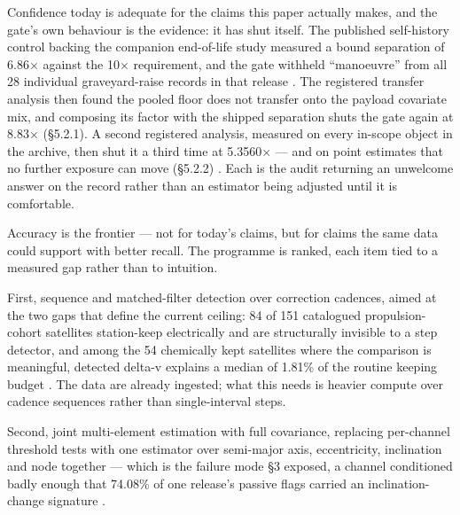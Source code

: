 \documentclass[11pt]{article}
\begin{document}
Confidence today is adequate for the claims this paper actually makes, and the gate's own behaviour is the evidence: it has shut itself. The published self-history control backing the companion end-of-life study measured a bound separation of 6.86$\times$ against the 10$\times$ requirement, and the gate withheld ``manoeuvre'' from all 28 individual graveyard-raise records in that release%
. The registered transfer analysis then found the pooled floor does not transfer onto the payload covariate mix, and composing its factor with the shipped separation shuts the gate again at 8.83$\times$ (\S{}5.2.1). A second registered analysis, measured on every in-scope object in the archive, then shut it a third time at 5.3560$\times$ --- and on point estimates that no further exposure can move (\S{}5.2.2)%
. Each is the audit returning an unwelcome answer on the record rather than an estimator being adjusted until it is comfortable.

Accuracy is the frontier --- not for today's claims, but for claims the same data could support with better recall. The programme is ranked, each item tied to a measured gap rather than to intuition.

First, sequence and matched-filter detection over correction cadences, aimed at the two gaps that define the current ceiling: 84 of 151 catalogued propulsion-cohort satellites station-keep electrically and are structurally invisible to a step detector, and among the 54 chemically kept satellites where the comparison is meaningful, detected delta-v explains a median of 1.81\% of the routine keeping budget%
. The data are already ingested; what this needs is heavier compute over cadence sequences rather than single-interval steps.

Second, joint multi-element estimation with full covariance, replacing per-channel threshold tests with one estimator over semi-major axis, eccentricity, inclination and node together --- which is the failure mode \S{}3 exposed, a channel conditioned badly enough that 74.08\% of one release's passive flags carried an inclination-change signature%
.
\end{document}
